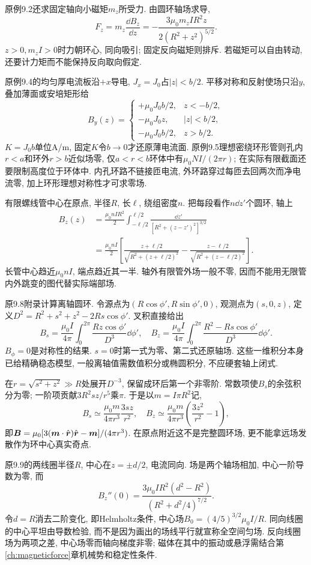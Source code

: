 \label{tb:offaxis-loop}
原例9.2还求固定轴向小磁矩$m_z$所受力. 由圆环轴场求导,
\[F_z=m_z\frac{\dd B_z}{\dd z}=-\frac{3\mu_0m_zIR^2z}{2(R^2+z^2)^{5/2}}.\]
$z>0,m_zI>0$时力朝环心, 同向吸引; 固定反向磁矩则排斥. 若磁矩可以自由转动, 还要计力矩而不能保持反向取向假定.

原例9.4的均匀厚电流板沿$+x$导电, $J_x=J_0$占$|z|<b/2$. 平移对称和反射使场只沿$y$, 叠加薄面或安培矩形给
\[B_y(z)=\begin{cases}+\mu_0J_0b/2,&z<-b/2,\\-\mu_0J_0z,&|z|<b/2,\\-\mu_0J_0b/2,&z>b/2.\end{cases}\]
$K=J_0b$单位A/m, 固定$K$令$b\to0$才还原薄电流面. 原例9.5理想密绕环形管则孔内$r<a$和环外$r>b$近似场零, 仅$a<r<b$环体中有$\mu_0NI/(2\pi r)$; 在实际有限截面还要限制高度位于环体中. 内孔环路不链接匝电流, 外环路穿过每匝去回两次而净电流零, 加上环形理想对称性才可求零场.

有限螺线管中心在原点, 半径$R$, 长$\ell$, 绕组密度$n$. 把每段看作$n\dd z'$个圆环, 轴上
\begin{align*}
B_z(z)&=\frac{\mu_0nI R^2}2\int_{-\ell/2}^{\ell/2}\frac{\dd z'}{[R^2+(z-z')^2]^{3/2}}\\
&=\frac{\mu_0nI}2\left[\frac{z+\ell/2}{\sqrt{R^2+(z+\ell/2)^2}}-\frac{z-\ell/2}{\sqrt{R^2+(z-\ell/2)^2}}\right].
\end{align*}
长管中心趋近$\mu_0nI$, 端点趋近其一半. 轴外有限管外场一般不零, 因而不能用无限管内外跳变的图代替实际端部场.

原9.8附录计算离轴圆环. 令源点为$(R\cos\phi',R\sin\phi',0)$, 观测点为$(s,0,z)$, 定义$D^2=R^2+s^2+z^2-2Rs\cos\phi'$. 叉积直接给出
\[B_s=\frac{\mu_0I}{4\pi}\int_0^{2\pi}\frac{Rz\cos\phi'}{D^3}\dd\phi',\quad
B_z=\frac{\mu_0I}{4\pi}\int_0^{2\pi}\frac{R^2-Rs\cos\phi'}{D^3}\dd\phi'.\]
$B_\phi=0$是对称性的结果. $s=0$时第一式为零、第二式还原轴场. 这些一维积分本身已给精确稳态模型, 一般离轴值需数值积分或椭圆积分, 不应硬套轴上闭式.

在$r=\sqrt{s^2+z^2}\gg R$处展开$D^{-3}$, 保留成环后第一个非零阶. 常数项使$B_s$的余弦积分为零; 一阶项贡献$3R^2sz/r^5$乘$\pi$. 于是以$m=I\pi R^2$记,
\[B_s\simeq\frac{\mu_0m}{4\pi r^3}\frac{3sz}{r^2},\quad
B_z\simeq\frac{\mu_0m}{4\pi r^3}\left(\frac{3z^2}{r^2}-1\right),\]
即$\boldsymbol{B}=\mu_0[3(\boldsymbol{m}\cdot\hat{\boldsymbol{r}})\hat{\boldsymbol{r}}-\boldsymbol{m}]/(4\pi r^3)$. 在原点附近这不是完整圆环场, 更不能拿远场发散作为环中心真实奇点.

原9.9的两线圈半径$R$, 中心在$z=\pm d/2$, 电流同向. 场是两个轴场相加, 中心一阶导数为零, 而
\[B_z''(0)=\frac{3\mu_0IR^2(d^2-R^2)}{(R^2+d^2/4)^{7/2}}.\]
令$d=R$消去二阶变化, 即Helmholtz条件, 中心场$B_0=(4/5)^{3/2}\mu_0I/R$. 同向线圈的中心平坦由导数检验, 而不是因为画出的场线平行就宣称全空间匀场. 反向线圈场为两项之差, 中心场零而轴向梯度非零; 磁体在其中的振动或悬浮需结合第\ref{ch:magneticforce}章机械势和稳定性条件.

